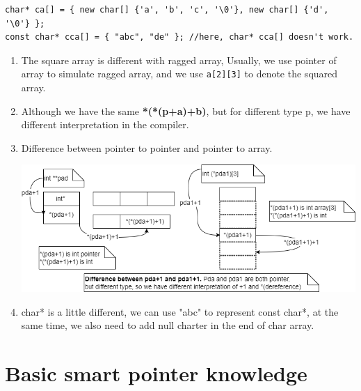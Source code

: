 \documentclass[a4paper,11pt,twoside]{book}
\begin{document}
\begin{itemize}
\begin{lstlisting}
char* ca[] = { new char[] {'a', 'b', 'c', '\0'}, new char[] {'d', '\0'} };
const char* cca[] = { "abc", "de" }; //here, char* cca[] doesn't work.
\end{lstlisting}
	\begin{enumerate}
		\item The square array is different with ragged array, Usually, we use pointer of array to simulate ragged array, and we use \texttt{a[2][3]} to denote the squared array.
		
		\item Although we have the same \textbf{*(*(p+a)+b)}, but for different type p, we have different interpretation in the compiler. 
		
		\item Difference between pointer to pointer and pointer to array.
		\begin{center}
			\includegraphics[width=0.9\linewidth]{pics/array.drawio}
		\end{center}
		
		\item char* is a little different, we can use "abc" to represent const char*, at the same time, we also need to add null charter in the end of char array.
		
	\end{enumerate}
	
\end{itemize}


\section{Basic smart pointer knowledge}
\end{document}

